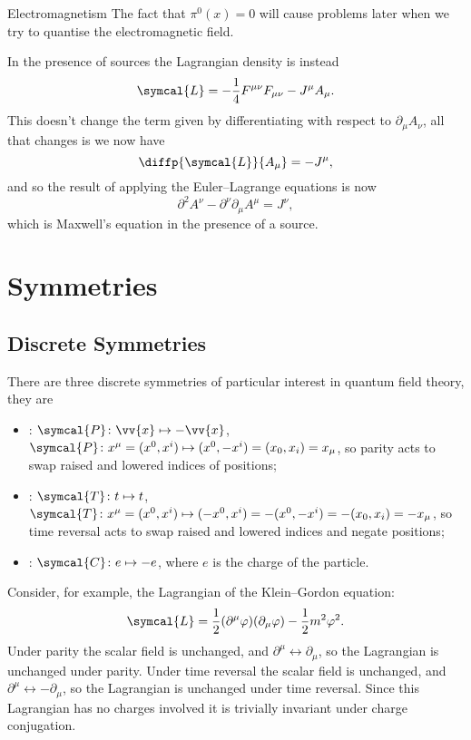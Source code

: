 \documentclass[fleqn]{NotesClass}
\newcommand{\dalembertian}{\partial^2}
\newcommand{\lagrangianDensity}{\symcal{L}}
\newcommand{\parity}{\symcal{P}}
\newcommand{\chargeConjugation}{\symcal{C}}
\newcommand{\timeReversal}{\symcal{T}}
\begin{document}
\begin{exm}{Electromagnetism}{}
        The fact that \(\pi^0(x) = 0\) will cause problems later when we try to quantise the electromagnetic field.
        
        In the presence of sources the Lagrangian density is instead
        \begin{equation}
            \lagrangianDensity = -\frac{1}{4}F^{\mu\nu}F_{\mu\nu} - J^\mu A_\mu.
        \end{equation}
        This doesn't change the term given by differentiating with respect to \(\partial_\mu A_\nu\), all that changes is we now have
        \begin{equation}
            \diffp{\lagrangianDensity}{A_\mu} = -J^\mu,
        \end{equation}
        and so the result of applying the Euler--Lagrange equations is now
        \begin{equation}
            \dalembertian A^\nu - \partial^\nu \partial_\mu A^\mu = J^\nu,
        \end{equation}
        which is Maxwell's equation in the presence of a source.
    \end{exm}
    
    \section{Symmetries}
    \subsection{Discrete Symmetries}
    There are three discrete symmetries of particular interest in quantum field theory, they are
    \begin{itemize}
        \item {}: \(\parity \colon \vv{x} \mapsto -\vv{x}\), \(\parity \colon x^\mu = (x^0, x^i) \mapsto (x^0, -x^i) = (x_0, x_i) = x_\mu\), so parity acts to swap raised and lowered indices of positions;
        \item {}: \(\timeReversal \colon t \mapsto t\), \(\timeReversal \colon x^\mu = (x^0, x^i) \mapsto (-x^0, x^i) = -(x^0, -x^i) = -(x_0, x_i) = -x_\mu\), so time reversal acts to swap raised and lowered indices and negate positions;
        \item {}: \(\chargeConjugation \colon e \mapsto -e\), where \(e\) is the charge of the particle.
    \end{itemize}
    
    Consider, for example, the Lagrangian of the Klein--Gordon equation:
    \begin{equation}
        \lagrangianDensity = \frac{1}{2}(\partial^\mu \varphi)(\partial_\mu\varphi) - \frac{1}{2}m^2 \varphi^2.
    \end{equation}
    Under parity the scalar field is unchanged, and \(\partial^\mu \leftrightarrow \partial_\mu\), so the Lagrangian is unchanged under parity.
    Under time reversal the scalar field is unchanged, and \(\partial^\mu \leftrightarrow -\partial_\mu\), so the Lagrangian is unchanged under time reversal.
    Since this Lagrangian has no charges involved it is trivially invariant under charge conjugation.
    
\end{document}
